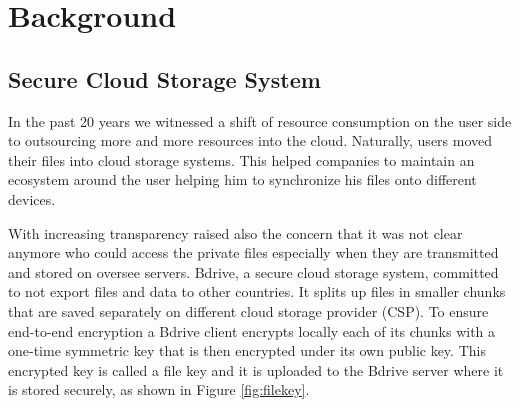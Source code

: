 \chapter{Background}

\section{Secure Cloud Storage System}
In the past 20 years we witnessed a shift of resource consumption on the user side to outsourcing more and more resources into the cloud. Naturally, users moved their files into cloud storage systems. This helped companies to maintain an ecosystem around the user helping him to synchronize his files onto different devices.  

With increasing transparency raised also the concern that it was not clear anymore who could access the private files especially when they are transmitted and stored on oversee servers. Bdrive, a secure cloud storage system, committed to not export files and data to other countries. It splits up files in smaller chunks that are saved separately on different cloud storage provider (\ac{CSP}). To ensure end-to-end encryption a Bdrive client encrypts locally each of its chunks with a one-time symmetric key that is then encrypted under its own public key. This encrypted key is called a file key and it is uploaded to the Bdrive server where it is stored securely, as shown in Figure \ref{fig:filekey}.

